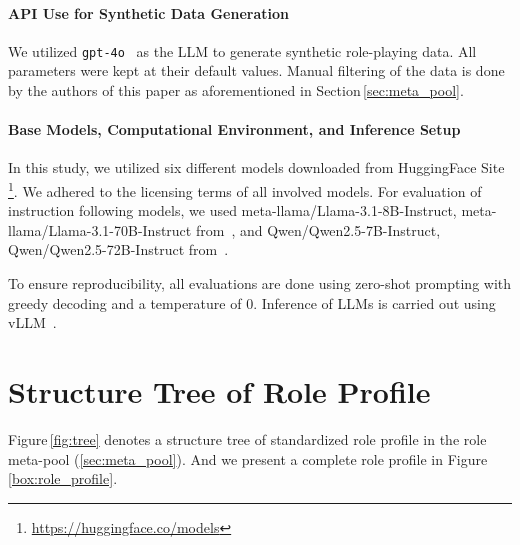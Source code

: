 \paragraph{API Use for Synthetic Data Generation} We utilized \texttt{gpt-4o}~\cite{gpt4} as the LLM to generate synthetic role-playing data. All parameters were kept at their default values. Manual filtering of the data is done by the authors of this paper as aforementioned in Section\,\ref{sec:meta_pool}. 

\paragraph{Base Models, Computational Environment, and Inference Setup} In this study, we utilized six different models downloaded from HuggingFace Site\,\footnote{\url{https://huggingface.co/models}}. We adhered to the licensing terms of all involved models. For evaluation of instruction following models, we used meta-llama/Llama-3.1-8B-Instruct, meta-llama/Llama-3.1-70B-Instruct from~\cite{llama3}, and Qwen/Qwen2.5-7B-Instruct, Qwen/Qwen2.5-72B-Instruct from~\cite{bai2023qwen,yang2024qwen2}. 

To ensure reproducibility, all evaluations are done using zero-shot prompting with greedy decoding and a temperature of 0. Inference of LLMs is carried out using vLLM~\cite{kwon2023efficient}. 

\section{Structure Tree of Role Profile}
\label{sec:app_tree}
Figure\,\ref{fig:tree} denotes a structure tree of standardized role profile in the role meta-pool (\hyperref[sec:meta_pool]{\textsection \ref{sec:meta_pool}}). And we present a complete role profile in Figure\,\ref{box:role_profile}.

